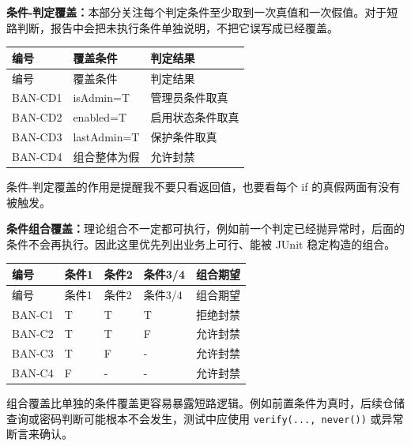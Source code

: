 \documentclass[bwprint]{report}
\begin{document}
\textbf{条件-判定覆盖：}本部分关注每个判定条件至少取到一次真值和一次假值。对于短路判断，报告中会把未执行条件单独说明，不把它误写成已经覆盖。
{
\setlength{\tabcolsep}{3pt}
\begin{longtable}{P{2.4cm}P{5.0cm}P{5.8cm}}
\toprule
编号 & 覆盖条件 & 判定结果\\
\midrule
\endfirsthead
\toprule
编号 & 覆盖条件 & 判定结果\\
\midrule
\endhead
BAN-\hspace{0pt}CD1 & is\hspace{0pt}Admin=\hspace{0pt}T & 管理员条件取真 \\
BAN-\hspace{0pt}CD2 & enabled=\hspace{0pt}T & 启用状态条件取真 \\
BAN-\hspace{0pt}CD3 & last\hspace{0pt}Admin=\hspace{0pt}T & 保护条件取真 \\
BAN-\hspace{0pt}CD4 & 组合整体为假 & 允许封禁 \\
\bottomrule
\end{longtable}
}
条件-判定覆盖的作用是提醒我不要只看返回值，也要看每个 if 的真假两面有没有被触发。

\textbf{条件组合覆盖：}理论组合不一定都可执行，例如前一个判定已经抛异常时，后面的条件不会再执行。因此这里优先列出业务上可行、能被 JUnit 稳定构造的组合。
{
\setlength{\tabcolsep}{3pt}
\begin{longtable}{P{2.4cm}P{2.0cm}P{2.0cm}P{2.0cm}P{4.1cm}}
\toprule
编号 & 条件1 & 条件2 & 条件3/4 & 组合期望\\
\midrule
\endfirsthead
\toprule
编号 & 条件1 & 条件2 & 条件3/4 & 组合期望\\
\midrule
\endhead
BAN-\hspace{0pt}C1 & T & T & T & 拒绝封禁 \\
BAN-\hspace{0pt}C2 & T & T & F & 允许封禁 \\
BAN-\hspace{0pt}C3 & T & F & - & 允许封禁 \\
BAN-\hspace{0pt}C4 & F & - & - & 允许封禁 \\
\bottomrule
\end{longtable}
}
组合覆盖比单独的条件覆盖更容易暴露短路逻辑。例如前置条件为真时，后续仓储查询或密码判断可能根本不会发生，测试中应使用 \texttt{verify(..., never())} 或异常断言来确认。
\end{document}
